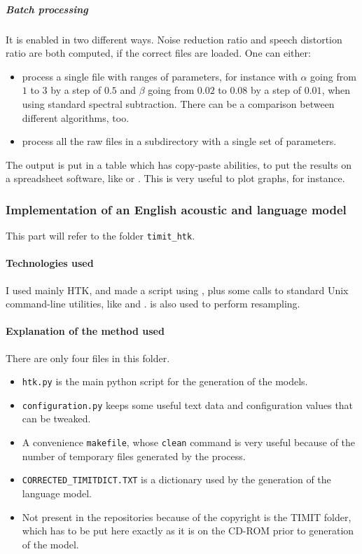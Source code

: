 \subparagraph{Batch processing} It is enabled in two different ways. 
Noise reduction ratio and speech distortion ratio are both computed, if the correct files are loaded.
One can either:
\begin{itemize}
\item process a single file with ranges of parameters, for instance with $\alpha$ going from $1$ to $3$ by a step of $0.5$ and  $\beta$ going from $0.02$ to $0.08$ by a step of $0.01$, when using standard spectral subtraction. There can be a comparison between different algorithms, too.
\item process all the raw files in a subdirectory with a single set of parameters.
\end{itemize}

The output is put in a table which has copy-paste abilities, to put the results on a spreadsheet software, like  or . This is very useful to plot graphs, for instance.
\subsubsection{Implementation of an English acoustic and language model}
This part will refer to the folder \texttt{timit\_htk}. 
\paragraph{Technologies used}
I used mainly \ac{HTK}, and made a script using , plus some calls to standard Unix command-line utilities, like  and .  is also used to perform resampling.
\paragraph{Explanation of the method used}
There are only four files in this folder.
\begin{itemize}
\item \texttt{htk.py} is the main python script for the generation of the models.
\item \texttt{configuration.py} keeps some useful text data and configuration values that can be tweaked.
\item A convenience \texttt{makefile}, whose \texttt{clean} command is very useful because of the number of temporary files generated by the process.
\item \texttt{CORRECTED\_TIMITDICT.TXT} is a dictionary used by the generation of the language model.
\item Not present in the repositories because of the copyright is the \ac{TIMIT} folder, which has to be put here exactly as it is on the CD-ROM prior to generation of the model.
\end{itemize}

